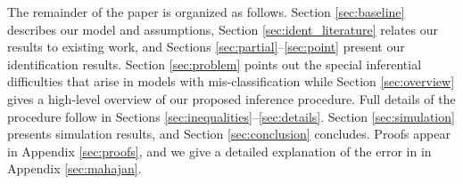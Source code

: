 
The remainder of the paper is organized as follows.
Section \ref{sec:baseline} describes our model and assumptions, Section \ref{sec:ident_literature} relates our results to existing work, and Sections \ref{sec:partial}--\ref{sec:point} present our identification results.
Section \ref{sec:problem} points out the special inferential difficulties that arise in models with mis-classification while Section \ref{sec:overview} gives a high-level overview of our proposed inference procedure.
Full details of the procedure follow in Sections \ref{sec:inequalities}--\ref{sec:details}.
Section \ref{sec:simulation} presents simulation results, and Section \ref{sec:conclusion} concludes.
Proofs appear in Appendix \ref{sec:proofs}, and we give a detailed explanation of the error in \cite{Mahajan} in Appendix \ref{sec:mahajan}.


